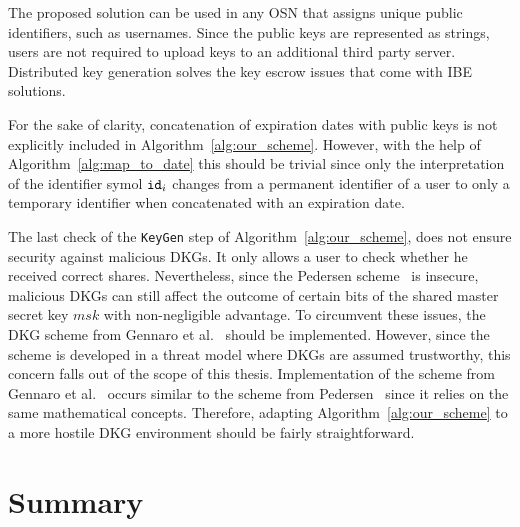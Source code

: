 The proposed solution can be used in any OSN that assigns unique public identifiers, such as usernames. Since the public keys are represented as strings, users are not required to upload keys to an additional third party server. Distributed key generation solves the key escrow issues that come with IBE solutions.

For the sake of clarity, concatenation of expiration dates with public keys is not explicitly included in Algorithm~\ref{alg:our_scheme}. However, with the help of Algorithm~\ref{alg:map_to_date} this should be trivial since only the interpretation of the identifier symol $\mathtt{id}_{i}$ changes from a permanent identifier of a user to only a temporary identifier when concatenated with an expiration date.

The last check of the \texttt{KeyGen} step of Algorithm~\ref{alg:our_scheme}, does not ensure security against malicious DKGs. It only allows a user to check whether he received correct shares. Nevertheless, since the Pedersen scheme~\cite{art:Pedersen91a} is insecure, malicious DKGs can still affect the outcome of certain bits of the shared master secret key $msk$ with non-negligible advantage. To circumvent these issues, the DKG scheme from Gennaro et al.~\cite{art:GennaroJKR07} should be implemented. However, since the scheme is developed in a threat model where DKGs are assumed trustworthy, this concern falls out of the scope of this thesis. Implementation of the scheme from Gennaro et al.~\cite{art:GennaroJKR07} occurs similar to the scheme from Pedersen~\cite{art:Pedersen91a} since it relies on the same mathematical concepts. Therefore, adapting Algorithm~\ref{alg:our_scheme} to a more hostile DKG environment should be fairly straightforward.

\section{Summary}


\newpage

\thispagestyle{empty}

\makeatletter
\setlength{\headsep}{-10pt}
\makeatother

